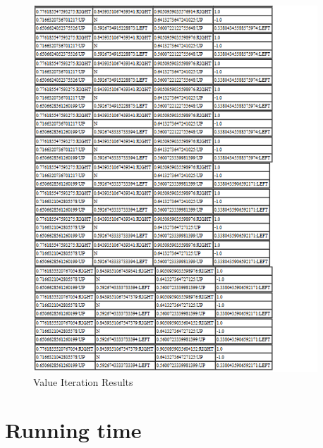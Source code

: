 \begin{figure}[hb]
    \label{fig:ValueIterationResults3}
    \begin{center}
        \includegraphics[width=0.95\textwidth]{Figures/Planning_Figure_4.png}
        \caption{Value Iteration Results}
    \end{center}
\end{figure}


\section{Running time}


